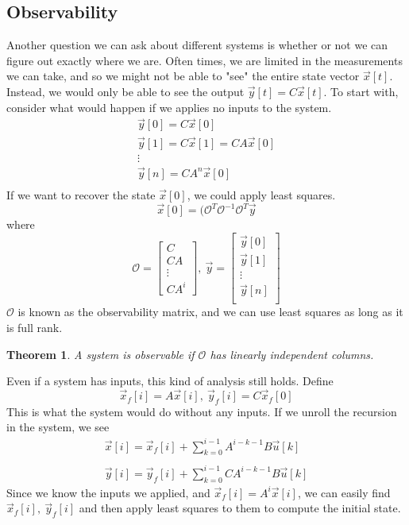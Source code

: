 \documentclass{article}
\newtheorem{theorem}{Theorem}
\begin{document}
\subsection{Observability}
Another question we can ask about different systems is whether or not we can figure out exactly where we are.
Often times, we are limited in the measurements we can take, and so we might not be able to "see" the entire state vector $\vec{x}[t]$.
Instead, we would only be able to see the output $\vec{y}[t]=C\vec{x}[t]$. To start with, consider what would happen if we applies no inputs to the system.
\[
    \begin{array}{c}
        \vec{y}[0] = C\vec{x}[0]\\
        \vec{y}[1] = C\vec{x}[1] = CA\vec{x}[0]\\
        \vdots\\
        \vec{y}[n] = CA^n\vec{x}[0]\\
    \end{array}
\]
If we want to recover the state $\vec{x}[0]$, we could apply least squares.
$$\vec{x}[0] = (\mathcal{O}^T\mathcal{O}^{-1}\mathcal{O}^T\vec{y}$$
where
\[
    \mathcal{O} = \left[
        \begin{array}{c}
            C\\
            CA\\
            \vdots\\
            CA^i
        \end{array}
    \right],\ \vec{y} = \left[
        \begin{array}{c}
            \vec{y}[0]\\
            \vec{y}[1]\\
            \vdots\\
            \vec{y}[n]\\
        \end{array}
        \right]
\]
$\mathcal{O}$ is known as the observability matrix, and we can use least squares as long as it is full rank.
\begin{theorem}
    A system is observable if $\mathcal{O}$ has linearly independent columns.
\end{theorem}
Even if a system has inputs, this kind of analysis still holds.
Define 
$$\vec{x}_f[i]=A\vec{x}[i],\ \vec{y}_f[i]=C\vec{x}_f[0]$$
This is what the system would do without any inputs. If we unroll the recursion in the system, we see
\[
    \begin{array}{c}
        \vec{x}[i] = \vec{x}_f[i]+\sum_{k=0}^{i-1}{A^{i-k-1}B\vec{u}[k]}\\\\
        \vec{y}[i] = \vec{y}_f[i]+\sum_{k=0}^{i-1}{CA^{i-k-1}B\vec{u}[k]}
    \end{array}
\]
Since we know the inputs we applied, and $\vec{x}_f[i]=A^i\vec{x}[i]$, we can easily find $\vec{x}_f[i],\ \vec{y}_f[i]$
and then apply least squares to them to compute the initial state.
\end{document}
